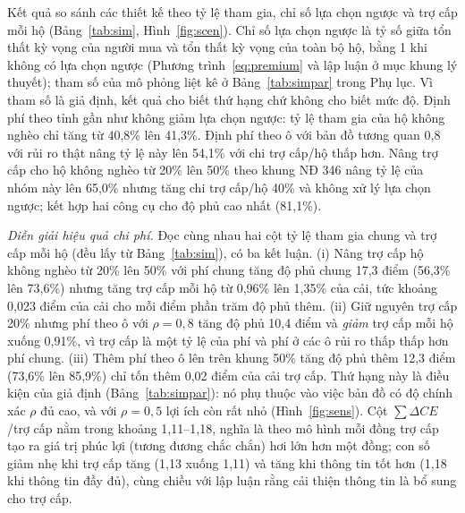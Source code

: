 \documentclass[12pt,a4paper]{article}
\begin{document}
Kết quả so sánh các thiết kế theo tỷ lệ tham gia, chỉ số lựa chọn ngược và trợ cấp mỗi hộ (Bảng~\ref{tab:sim}, Hình~\ref{fig:scen}). Chỉ số lựa chọn ngược là tỷ số giữa tổn thất kỳ vọng của người mua và tổn thất kỳ vọng của toàn bộ hộ, bằng 1 khi không có lựa chọn ngược (Phương trình~\eqref{eq:premium} và lập luận ở mục khung lý thuyết); tham số của mô phỏng liệt kê ở Bảng~\ref{tab:simpar} trong Phụ lục. Vì tham số là giả định, kết quả cho biết thứ hạng chứ không cho biết mức độ. Định phí theo tỉnh gần như không giảm lựa chọn ngược: tỷ lệ tham gia của hộ không nghèo chỉ tăng từ 40,8\% lên 41,3\%. Định phí theo ô với bản đồ tương quan 0,8 với rủi ro thật nâng tỷ lệ này lên 54,1\% với chi trợ cấp/hộ thấp hơn. Nâng trợ cấp cho hộ không nghèo từ 20\% lên 50\% theo khung NĐ 346 nâng tỷ lệ của nhóm này lên 65,0\% nhưng tăng chi trợ cấp/hộ 40\% và không xử lý lựa chọn ngược; kết hợp hai công cụ cho độ phủ cao nhất (81,1\%).

\textit{Diễn giải hiệu quả chi phí.} Đọc cùng nhau hai cột tỷ lệ tham gia chung và trợ cấp mỗi hộ (đều lấy từ Bảng~\ref{tab:sim}), có ba kết luận. (i) Nâng trợ cấp hộ không nghèo từ 20\% lên 50\% với phí chung tăng độ phủ chung 17,3 điểm (56,3\% lên 73,6\%) nhưng tăng trợ cấp mỗi hộ từ 0,96\% lên 1,35\% của cải, tức khoảng 0,023 điểm của cải cho mỗi điểm phần trăm độ phủ thêm. (ii) Giữ nguyên trợ cấp 20\% nhưng phí theo ô với $\rho=0{,}8$ tăng độ phủ 10,4 điểm và \emph{giảm} trợ cấp mỗi hộ xuống 0,91\%, vì trợ cấp là một tỷ lệ của phí và phí ở các ô rủi ro thấp thấp hơn phí chung. (iii) Thêm phí theo ô lên trên khung 50\% tăng độ phủ thêm 12,3 điểm (73,6\% lên 85,9\%) chỉ tốn thêm 0,02 điểm của cải trợ cấp. Thứ hạng này là điều kiện của giả định (Bảng~\ref{tab:simpar}): nó phụ thuộc vào việc bản đồ có độ chính xác $\rho$ đủ cao, và với $\rho=0{,}5$ lợi ích còn rất nhỏ (Hình~\ref{fig:sens}). Cột $\sum\Delta CE$/trợ cấp nằm trong khoảng 1,11--1,18, nghĩa là theo mô hình mỗi đồng trợ cấp tạo ra giá trị phúc lợi (tương đương chắc chắn) hơi lớn hơn một đồng; con số giảm nhẹ khi trợ cấp tăng (1,13 xuống 1,11) và tăng khi thông tin tốt hơn (1,18 khi thông tin đầy đủ), cùng chiều với lập luận rằng cải thiện thông tin là bổ sung cho trợ cấp.
\end{document}
